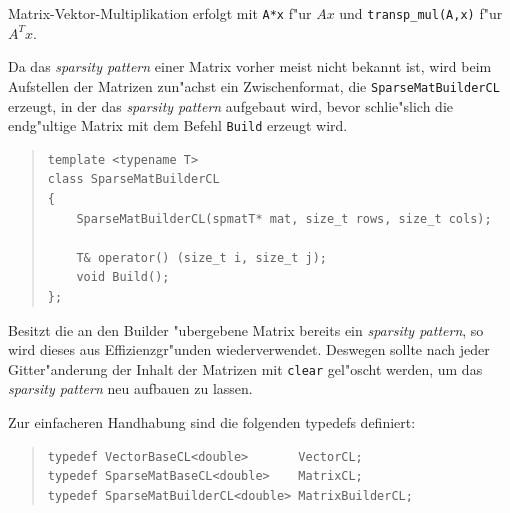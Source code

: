 \documentclass[11pt,a4paper]{article}
\newenvironment{Code}{\begin{quote}\scriptsize}{\end{quote}}
\begin{document}
Matrix-Vektor-Multiplikation erfolgt mit \verb|A*x| f"ur $Ax$ 
und \verb|transp_mul(A,x)| f"ur $A^Tx$.

Da das \emph{sparsity pattern} einer Matrix vorher meist nicht bekannt ist, wird
beim Aufstellen der Matrizen zun"achst ein Zwischenformat, die
\verb|SparseMatBuilderCL| erzeugt, in der das \emph{sparsity pattern} aufgebaut
wird, bevor schlie"slich die endg"ultige Matrix mit dem Befehl \verb|Build|
erzeugt wird. 
\begin{Code}
\begin{verbatim}
template <typename T>
class SparseMatBuilderCL
{
    SparseMatBuilderCL(spmatT* mat, size_t rows, size_t cols);

    T& operator() (size_t i, size_t j);
    void Build();
};
\end{verbatim}
\end{Code}
Besitzt die an den Builder "ubergebene Matrix bereits ein \emph{sparsity
pattern}, so wird dieses aus Effizienzgr"unden wiederverwendet. Deswegen sollte
nach jeder Gitter"anderung der Inhalt der Matrizen mit \verb|clear| gel"oscht
werden, um das \emph{sparsity pattern} neu aufbauen zu lassen.

Zur einfacheren Handhabung sind die folgenden typedefs definiert:
\begin{Code}
\begin{verbatim}
typedef VectorBaseCL<double>       VectorCL;
typedef SparseMatBaseCL<double>    MatrixCL;
typedef SparseMatBuilderCL<double> MatrixBuilderCL;
\end{verbatim}
\end{Code}
\end{document}
